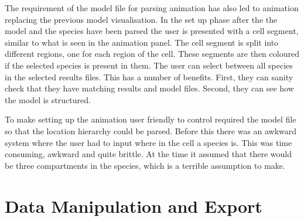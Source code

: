 The requirement of the model file for parsing animation has also led to animation replacing the previous model visualisation.  In the set up phase after the the model and the species have been parsed the user is presented with a cell segment, similar to what is seen in the animation panel.  The cell segment is split into different regions, one for each region of the cell.  These segments are then coloured if the selected species is present in them.  The user can select between all species in the selected results files.  This has a number of benefits.  First, they can sanity check that they have matching results and model files.  Second, they can see how the model is structured.

To make setting up the animation user friendly to control required the model file so that the location hierarchy could be parsed.  Before this there was an awkward system where the user had to input where in the cell a species is.  This was time consuming, awkward and quite brittle.  At the time it assumed that there would be three compartments in the species, which is a terrible assumption to make.

\section{Data Manipulation and Export}
